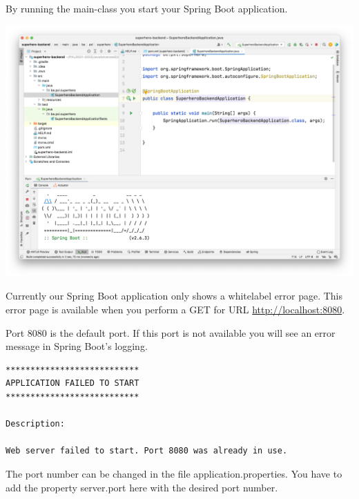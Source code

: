 \documentclass[a4paper, 12pt]{report}
\begin{document}
By running the main-class you start your Spring Boot application. 

\includegraphics[width=\textwidth]{./images/chapter2/first-run.png}

Currently our Spring Boot application only shows a whitelabel error page. This error page is available when you perform a GET for URL \url{http://localhost:8080}.


Port 8080 is the default port. If this port is not available you will see an error message in Spring Boot's logging.

\begin{lstlisting}[frame=single]
***************************
APPLICATION FAILED TO START
***************************

Description:

Web server failed to start. Port 8080 was already in use.
\end{lstlisting}

The port number can be changed in the file application.properties. You have to add the property server.port here with the desired port number.
\end{document}
